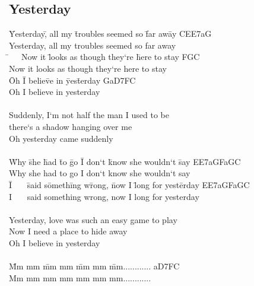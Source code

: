\documentclass[10pt,a5paper,twoside]{scrbook}
\begin{document}
    \subsection{Yesterday}
  \begin{tabbing}
\=Yesterday\=, all my \=troubles seemed so \=far aw\=ay\kill
\>C\>E\>E7\>a\>G\\
Yesterday, all my troubles seemed so far away\\


\=~~~Now it \=looks as though they`re \=here to stay\kill
\>F\>G\>C\\
Now it looks as though they`re here to stay\\


\=Oh \=I belie\=ve in \=yes\=terday\kill
\>G\>a\>D7\>F\>C\\
Oh I believe in yesterday\\
\\
Suddenly, I`m not half the man I used to be\\
there`s a shadow hanging over me\\
Oh yesterday came suddenly\\

\\
\=Why \=she \=had \=to \=go \=I don`t \=know she wouldn`t \=say\kill
\>E\>E7\>a\>G\>F\>a\>G\>C\\
Why she had to go I don`t know she wouldn`t say\\

\=I~~~ \=said s\=ometh\=ing w\=rong, \=now I \=long for yest\=erday\kill
\>E\>E7\>a\>G\>F\>a\>G\>C\\
I~~~ said something wrong, now I long for yesterday\\
\\
Yesterday, love was such an easy game to play\\
Now I need a place to hide away\\
Oh I believe in yesterday\\
\\
\=Mm mm \=mm mm \=mm mm \=mm............\kill
\>a\>D7\>F\>C\\
Mm mm mm mm mm mm mm............\\
\end{tabbing}

  	
  	  
     \newpage  

   \newpage
\end{document}
